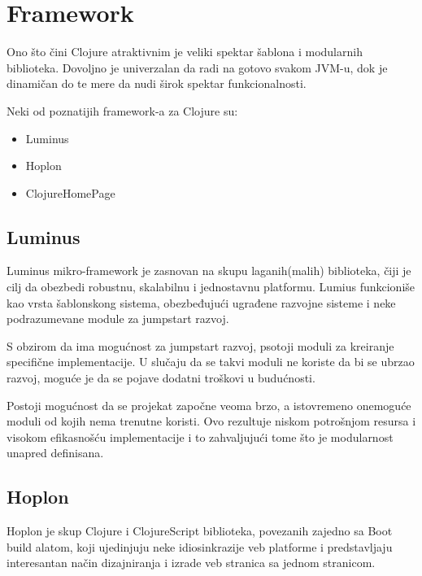 \section{Framework}
\label{sec:framework}
Ono što čini Clojure atraktivnim je veliki spektar šablona i modularnih biblioteka. Dovoljno je univerzalan da radi na gotovo svakom JVM-u, dok je dinamičan do te mere da nudi širok spektar funkcionalnosti.


Neki od poznatijih framework-a za Clojure su:\cite{frameworks}

\begin{itemize}
            \item Luminus
            \item Hoplon
            \item ClojureHomePage
\end{itemize}

\subsection{Luminus}
\label{subsec:luminus}
Luminus mikro-framework je zasnovan na skupu laganih(malih) biblioteka, čiji je cilj da obezbedi robustnu, skalabilnu i jednostavnu platformu. Lumius funkcioniše kao vrsta šablonskong sistema, obezbeđujući ugrađene razvojne sisteme i neke
podrazumevane module za jumpstart razvoj.\cite{luminus}


S obzirom da ima mogućnost za jumpstart razvoj, psotoji moduli za kreiranje specifične implementacije. U slučaju
da se takvi moduli ne koriste da bi se ubrzao razvoj, moguće je da se pojave dodatni troškovi u budućnosti.

Postoji mogućnost da se projekat započne veoma brzo, a istovremeno onemoguće moduli od kojih nema trenutne koristi. Ovo rezultuje niskom potrošnjom resursa i visokom efikasnošću implementacije i to zahvaljujući tome što je modularnost unapred definisana.\cite{frameworks}

\subsection{Hoplon}
\label{subsec:hoplon}
Hoplon je skup Clojure i ClojureScript biblioteka, povezanih zajedno sa Boot build alatom, koji ujedinjuju neke idiosinkrazije veb platforme i predstavljaju interesantan način dizajniranja i izrade veb stranica sa jednom stranicom.\cite{hoplon}


